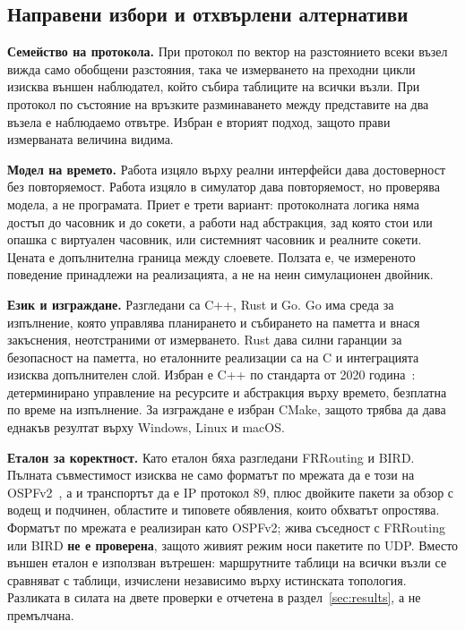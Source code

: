 \subsection{Направени избори и отхвърлени алтернативи}

\textbf{Семейство на протокола.} При протокол по вектор на разстоянието всеки възел вижда само
обобщени разстояния, така че измерването на преходни цикли изисква външен наблюдател, който
събира таблиците на всички възли. При протокол по състояние на връзките разминаването между
представите на два възела е наблюдаемо отвътре. Избран е вторият подход, защото прави
измерваната величина видима.

\textbf{Модел на времето.} Работа изцяло върху реални интерфейси дава достоверност без
повторяемост. Работа изцяло в симулатор дава повторяемост, но проверява модела, а не
програмата. Приет е трети вариант: протоколната логика няма достъп до часовник и до сокети, а
работи над абстракция, зад която стои или опашка с виртуален часовник, или системният часовник
и реалните сокети. Цената е допълнителна граница между слоевете. Ползата е, че измереното
поведение принадлежи на реализацията, а не на неин симулационен двойник.

\textbf{Език и изграждане.} Разгледани са C++, Rust и Go. Go има среда за изпълнение, която
управлява планирането и събирането на паметта и внася закъснения, неотстраними от измерването.
Rust дава силни гаранции за безопасност на паметта, но еталонните реализации са на C и
интеграцията изисква допълнителен слой. Избран е C++ по стандарта от 2020
година~\cite{iso_cpp20}: детерминирано управление на ресурсите и абстракция върху времето,
безплатна по време на изпълнение. За изграждане е избран CMake, защото трябва да дава еднакъв
резултат върху Windows, Linux и macOS.

\textbf{Еталон за коректност.} Като еталон бяха разгледани FRRouting и BIRD. Пълната
съвместимост изисква не само форматът по мрежата да е този на OSPFv2~\cite{rfc2328}, а и
транспортът да е IP протокол 89, плюс двойките пакети за обзор с водещ и подчинен, областите и
типовете обявления, които обхватът опростява. Форматът по мрежата е реализиран като OSPFv2;
жива съседност с FRRouting или BIRD \textbf{не е проверена}, защото живият режим носи пакетите
по UDP. Вместо външен еталон е използван вътрешен: маршрутните таблици на всички възли се
сравняват с таблици, изчислени независимо върху истинската топология. Разликата в силата на
двете проверки е отчетена в раздел~\ref{sec:results}, а не премълчана.
